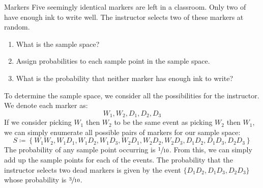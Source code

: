 \begin{exbox}{Markers}{}
    Five seemingly identical markers are left in a classroom. Only two of have enough ink to write well. The instructor selects two of these markers at random.
    \begin{enumerate}
        \item What is the sample space?
        \item Assign probabilities to each sample point in the sample space.
        \item What is the probability that neither marker has enough ink to write?
    \end{enumerate}
    \tcblower
    To determine the sample space, we consider all the possibilities for the instructor. We denote each marker as:
    \[ W_1, W_2, D_1, D_2, D_3 \]
    If we consider picking $W_1$ then $W_2$ to be the same event as picking $W_2$ then $W_1$, we can simply enumerate all possible pairs of markers for our sample space:
    \[ S \coloneq \left\{ W_1W_2, W_1D_1, W_1D_2, W_1D_3, W_2D_1, W_2D_2, W_2D_3, D_1D_2, D_1D_3, D_2D_3 \right\} \]
    The probability of any sample point occurring is $\sfrac{1}{10}$. From this, we can simply add up the sample points for each of the events. The probability that the instructor selects two dead markers is given by the event $\{D_1D_2, D_1D_3, D_2D_3\}$ whose probability is $\sfrac{3}{10}$.
\end{exbox}
